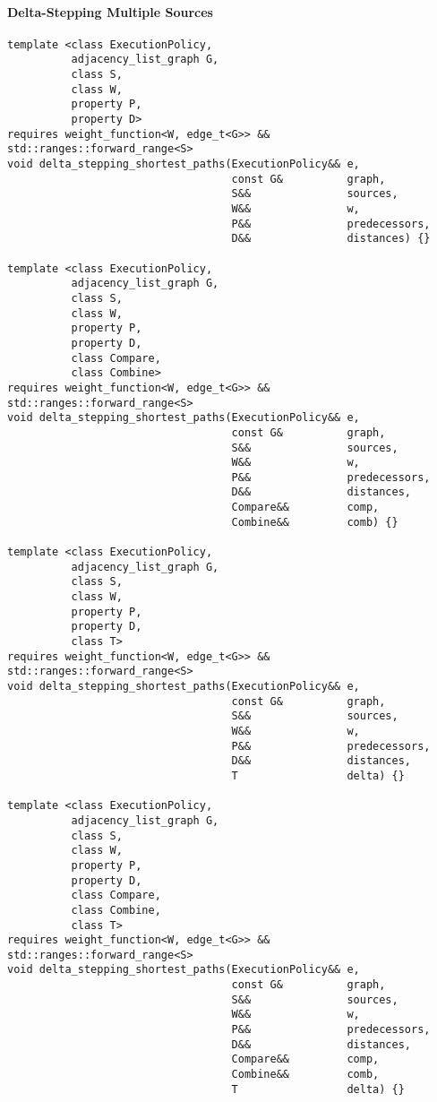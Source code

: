 \paragraph{Delta-Stepping Multiple Sources}
\begin{lstlisting}
template <class ExecutionPolicy,
          adjacency_list_graph G,
          class S,
          class W,
          property P,
          property D>
requires weight_function<W, edge_t<G>> && std::ranges::forward_range<S>
void delta_stepping_shortest_paths(ExecutionPolicy&& e,
                                   const G&          graph,
                                   S&&               sources,
                                   W&&               w,
                                   P&&               predecessors,
                                   D&&               distances) {}

template <class ExecutionPolicy,
          adjacency_list_graph G,
          class S,
          class W,
          property P,
          property D,
          class Compare,
          class Combine>
requires weight_function<W, edge_t<G>> && std::ranges::forward_range<S>
void delta_stepping_shortest_paths(ExecutionPolicy&& e,
                                   const G&          graph,
                                   S&&               sources,
                                   W&&               w,
                                   P&&               predecessors,
                                   D&&               distances,
                                   Compare&&         comp,
                                   Combine&&         comb) {}

template <class ExecutionPolicy,
          adjacency_list_graph G,
          class S,
          class W,
          property P,
          property D,
          class T>
requires weight_function<W, edge_t<G>> && std::ranges::forward_range<S>
void delta_stepping_shortest_paths(ExecutionPolicy&& e,
                                   const G&          graph,
                                   S&&               sources,
                                   W&&               w,
                                   P&&               predecessors,
                                   D&&               distances,
                                   T                 delta) {}

template <class ExecutionPolicy,
          adjacency_list_graph G,
          class S,
          class W,
          property P,
          property D,
          class Compare,
          class Combine,
          class T>
requires weight_function<W, edge_t<G>> && std::ranges::forward_range<S>
void delta_stepping_shortest_paths(ExecutionPolicy&& e,
                                   const G&          graph,
                                   S&&               sources,
                                   W&&               w,
                                   P&&               predecessors,
                                   D&&               distances,
                                   Compare&&         comp,
                                   Combine&&         comb,
                                   T                 delta) {}

\end{lstlisting}
